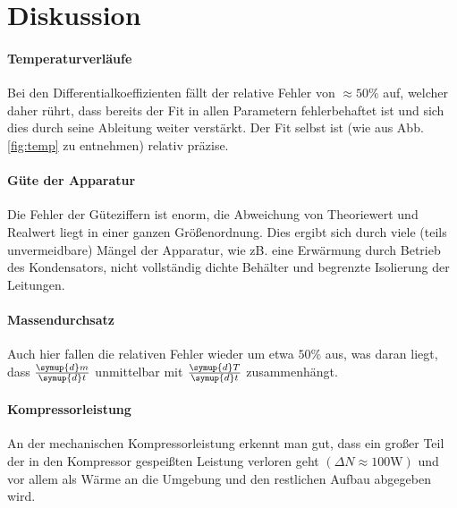 \section{Diskussion}
\label{sec:Diskussion}
\paragraph{Temperaturverläufe}
Bei den Differentialkoeffizienten fällt der relative Fehler von $\approx 50 \%$ auf, welcher daher rührt, dass bereits der Fit in allen Parametern fehlerbehaftet ist und sich dies durch seine Ableitung weiter verstärkt. Der Fit selbst ist (wie aus Abb. \ref{fig:temp} zu entnehmen) relativ präzise.

\paragraph{Güte der Apparatur}
Die Fehler der Güteziffern ist enorm, die Abweichung von Theoriewert und Realwert liegt in einer ganzen Größenordnung. Dies ergibt sich durch viele (teils unvermeidbare) Mängel der Apparatur, wie zB. eine Erwärmung durch Betrieb des Kondensators, nicht vollständig dichte Behälter und begrenzte Isolierung der Leitungen.

\paragraph{Massendurchsatz}
Auch hier fallen die relativen Fehler wieder um etwa $50\%$ aus, was daran liegt, dass $\frac{\symup{d}m}{\symup{d}t}$ unmittelbar mit $\frac{\symup{d}T}{\symup{d}t}$ zusammenhängt.

\paragraph{Kompressorleistung}
An der mechanischen Kompressorleistung erkennt man gut, dass ein großer Teil der in den Kompressor gespeißten Leistung verloren geht $(\Delta N \approx 100 \si{\watt})$ und vor allem als Wärme an die Umgebung und den restlichen Aufbau abgegeben wird.
